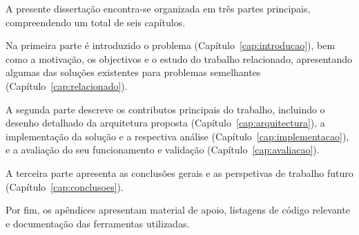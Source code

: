 A presente dissertação encontra-se organizada em três partes principais, compreendendo um total de seis capítulos.

Na primeira parte é introduzido o problema (Capítulo~\ref{cap:introducao}), bem como a motivação, os objectivos e o estudo do trabalho relacionado, apresentando algumas das soluções existentes para problemas semelhantes (Capítulo~\ref{cap:relacionado}).

A segunda parte descreve os contributos principais do trabalho, incluindo o desenho detalhado da arquitetura proposta (Capítulo~\ref{cap:arquitectura}), a implementação da solução e a respectiva análise (Capítulo~\ref{cap:implementacao}), e a avaliação do seu funcionamento e validação (Capítulo~\ref{cap:avaliacao}).

A terceira parte apresenta as conclusões gerais e as perspetivas de trabalho futuro (Capítulo~\ref{cap:conclusoes}).

Por fim, os apêndices apresentam material de apoio, listagens de código relevante e documentação das ferramentas utilizadas.
